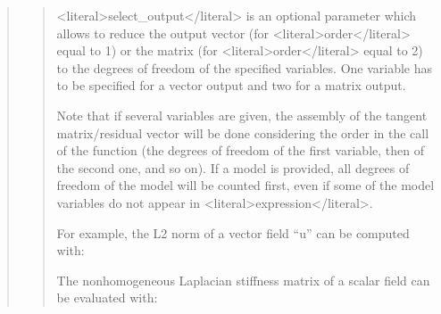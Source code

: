 \documentclass[a4paper,11pt,english]{sphinxmanual}
\begin{document}
\begin{quote}
\begin{quote}
\sphinxAtStartPar
\textless{}literal\textgreater{}select\_output\textless{}/literal\textgreater{} is an optional parameter which allows to reduce the
output vector (for \textless{}literal\textgreater{}order\textless{}/literal\textgreater{} equal to 1) or the matrix (for \textless{}literal\textgreater{}order\textless{}/literal\textgreater{}
equal to 2) to the degrees of freedom of the specified variables.
One variable has to be specified for a vector output and two for a
matrix output.

\sphinxAtStartPar
Note that if several variables are given, the assembly of the
tangent matrix/residual vector will be done considering the order
in the call of the function (the degrees of freedom of the first
variable, then of the second one, and so on). If a model is provided,
all degrees of freedom of the model will be counted first, even if
some of the model variables do not appear in \textless{}literal\textgreater{}expression\textless{}/literal\textgreater{}.

\sphinxAtStartPar
For example, the L2 norm of a vector field “u” can be computed with:

\begin{sphinxVerbatim}[commandchars=\\\{\}]
      

        
\end{sphinxVerbatim}

\sphinxAtStartPar
The nonhomogeneous Laplacian stiffness matrix of a scalar field can be evaluated with:

\begin{sphinxVerbatim}[commandchars=\\\{\}]
       


\end{sphinxVerbatim}
\end{quote}
\end{quote}
\end{document}
